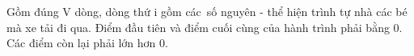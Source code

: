 Gồm đúng V dòng, dòng thứ i gồm các số nguyên - thể hiện trình tự nhà các bé mà xe tải đi qua. Điểm đầu tiên và điểm cuối cùng của hành trình phải bằng 0. Các điểm còn lại phải lớn hơn 0.